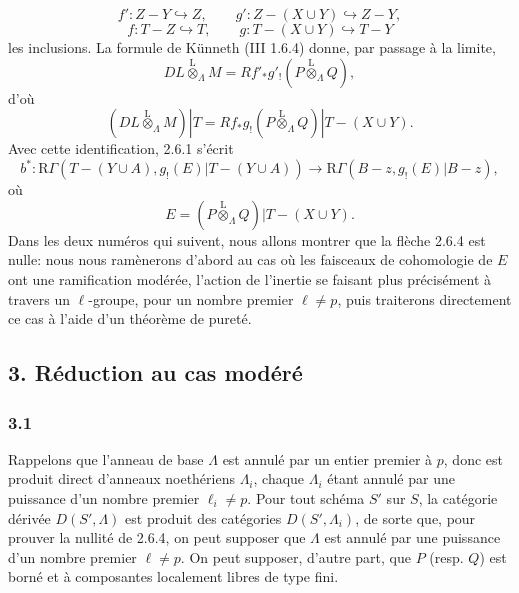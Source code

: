 \documentclass[11pt]{article}
\providecommand{\lten}{\overset{\mathrm L}{\otimes}}
\providecommand{\lten}{\overset{\mathrm L}{\otimes}}
\providecommand{\lten}{\overset{\mathrm L}{\otimes}}
\providecommand{\lten}{\overset{\mathrm L}{\otimes}}
\providecommand{\lten}{\overset{\mathrm L}{\otimes}}
\providecommand{\lten}{\overset{\mathrm L}{\otimes}}
\begin{document}
\[
f':Z-Y\hookrightarrow Z,\qquad
g':Z-(X\cup Y)\hookrightarrow Z-Y,
\]
\[
f:T-Z\hookrightarrow T,\qquad
g:T-(X\cup Y)\hookrightarrow T-Y
\]
les inclusions. La formule de Künneth (III 1.6.4) donne, par passage à la limite,
\[
DL\lten_{\Lambda}M=Rf'_*g'_!(P\lten_{\Lambda}Q),
\]
d'où
\begin{equation}
(DL\lten_{\Lambda}M)|T=Rf_*g_!(P\lten_{\Lambda}Q)|T-(X\cup Y).
\tag{2.6.3}
\end{equation}
Avec cette identification, 2.6.1 s'écrit
\begin{equation}
b^*:\mathrm R\Gamma(T-(Y\cup A),g_!(E)|T-(Y\cup A))
 \longrightarrow \mathrm R\Gamma(B-z,g_!(E)|B-z),
\tag{2.6.4}
\end{equation}
où
\[
E=(P\lten_{\Lambda}Q)|T-(X\cup Y).
\]
Dans les deux numéros qui suivent, nous allons montrer que la flèche 2.6.4 est nulle: nous nous ramènerons d'abord au cas où les faisceaux de cohomologie de $E$ ont une ramification modérée, l'action de l'inertie se faisant plus précisément à travers un $\ell$-groupe, pour un nombre premier $\ell\ne p$, puis traiterons directement ce cas à l'aide d'un théorème de pureté.

\subsection*{3. Réduction au cas modéré}

\subsubsection*{3.1}
Rappelons que l'anneau de base $\Lambda$ est annulé par un entier premier à $p$, donc est produit direct d'anneaux noethériens $\Lambda_i$, chaque $\Lambda_i$ étant annulé par une puissance d'un nombre premier $\ell_i\ne p$. Pour tout schéma $S'$ sur $S$, la catégorie dérivée $D(S',\Lambda)$ est produit des catégories $D(S',\Lambda_i)$, de sorte que, pour prouver la nullité de 2.6.4, on peut supposer que $\Lambda$ est annulé par une puissance d'un nombre premier $\ell\ne p$. On peut supposer, d'autre part, que $P$ (resp. $Q$) est borné et à composantes localement libres de type fini.
\end{document}
